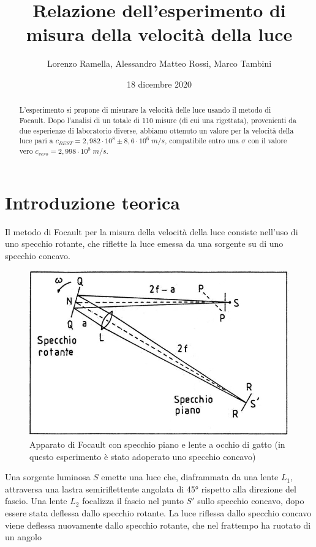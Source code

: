 \documentclass{article}
\title{Relazione dell'esperimento di misura della velocità della luce}
\author{Lorenzo Ramella, Alessandro Matteo Rossi, Marco Tambini}
\date{18 dicembre 2020}
\begin{document}
\maketitle

\begingroup
{}
\begin{abstract}
    \centering
L’esperimento si propone di misurare la velocità delle luce usando il metodo di Focault. Dopo l'analisi di un totale di 110 misure (di cui una rigettata), provenienti 
da due esperienze di laboratorio diverse, abbiamo ottenuto un valore per la velocità della luce pari a $c_{BEST}=2,982\cdot10^8 \pm 8,6\cdot 10^6 \; m/s$, compatibile
entro una $\sigma$ con il valore vero $c_{vero}=2,998\cdot10^8 \; m/s$.
\end{abstract}
\endgroup


\tableofcontents
\newpage


\section{Introduzione teorica}
Il metodo di Focault per la misura della velocità della luce consiste nell'uso di uno specchio rotante, che riflette la luce emessa da una sorgente su di uno specchio 
concavo. 

\begin{figure}[h!]
    \centering
    \includegraphics[width=0.5\linewidth]{App_Focault.JPG}
    \captionsetup{justification=centering,margin=0cm}
    \caption{Apparato di Focault con specchio piano e lente a occhio di gatto (in questo esperimento è stato adoperato uno specchio concavo)}
    \label{App_Focault}
\end{figure}

Una sorgente luminosa $S$ emette una luce che, diaframmata da una lente $L_1$, attraversa una lastra semiriflettente angolata di 45° rispetto alla 
direzione del fascio. Una lente $L_2$ focalizza il fascio nel punto $S'$ sullo specchio concavo, dopo essere stata deflessa dallo specchio rotante. La luce riflessa 
dallo specchio concavo viene deflessa nuovamente dallo specchio rotante, che nel frattempo ha ruotato di un angolo 
\end{document}
